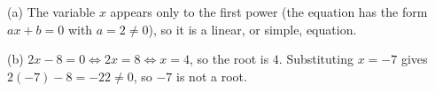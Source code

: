 (a) The variable $x$ appears only to the first power (the equation has the form $ax+b=0$ with $a=2\ne0$), so it is a linear, or simple, equation.

(b) $2x-8=0\iff2x=8\iff x=4$, so the root is $\boxed{4}$. Substituting $x=-7$ gives $2(-7)-8=-22\ne0$, so $-7$ is not a root.
